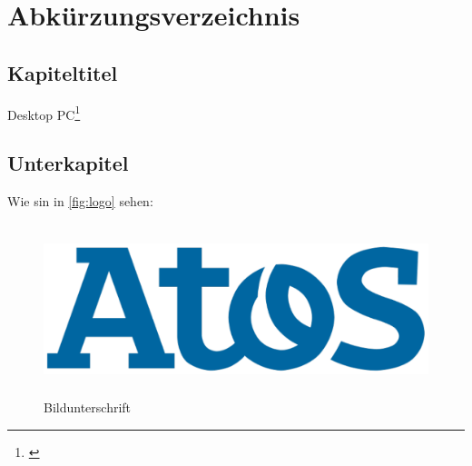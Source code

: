 \documentclass[
a4paper,   
titlepage,  
halfparskip,
12pt        
]{scrartcl}
\begin{document}

\newpage
\tableofcontents
\newpage
\section*{Abkürzungsverzeichnis} %
\begin{acronym}[Name]
\end{acronym}
\listoffigures
\listoftables
\setcounter{table}{0} %
\newpage
\begin{onehalfspacing} %
\pagestyle{fancy}
\fancyhf{} %
\fancyhead[L]{\leftmark} %
\fancyhead[R]{\thepage} %


\section{Kapiteltitel}
\label{sec:kap}
Desktop \acs{PC}\footnote{\cite[Crusher, W. (2014) S. 53]{quelle}}
\newpage
\subsection{Unterkapitel}
\label{subsec:kap}
Wie sin in \autoref{fig:logo} sehen: 
\begin{figure}[h]
  \centering
  \includegraphics[height=5.0cm]{logo}
  \caption[Beschreibung im Verzeichnis]{Bildunterschrift\footnotemark}\label{fig:logo}
\end{figure}
\newpage

\end{onehalfspacing}
\end{document}
